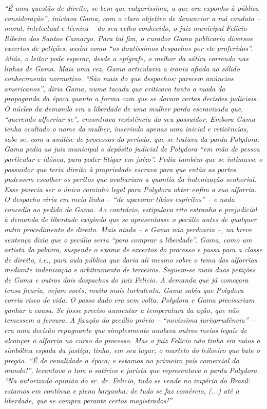 {\begin{didascalia}
\emph{``É uma questão de direito, se bem que vulgaríssima, a que ora
exponho à pública consideração'', iniciava Gama, com o claro objetivo de
denunciar a má conduta -- moral, intelectual e técnica -- do seu velho
conhecido, o juiz municipal Felicio Ribeiro dos Santos Camargo. Para tal
fim, o curador Gama publicaria diversos excertos de petições, assim como
``os doutíssimos despachos por ele proferidos''. Aliás, o leitor pode
esperar, desde a epígrafe, o melhor da sátira correndo nas linhas de
Gama. Mais uma vez, Gama articularia a ironia afiada ao sólido
conhecimento normativo. ``São mais do que despachos; parecem anúncios
americanos'', diria Gama, numa tacada que criticava tanto a moda da
propaganda da época quanto a forma com que se davam certas decisões
judiciais. O núcleo da demanda era a liberdade de uma mulher parda
escravizada que, ``querendo alforriar-se'', encontrava resistência do seu
possuidor. Embora Gama tenha ocultado o nome da mulher, inserindo apenas
uma inicial e reticências, sabe-se, com a análise de processos do
período, que se tratava da parda Polydora. Gama pedia ao juiz municipal
o depósito judicial de Polydora ``em mão de pessoa particular e idônea,
para poder litigar em juízo''. Pedia também que se intimasse o possuidor
que teria direito à propriedade escrava para que então as partes
pudessem escolher os peritos que avaliariam a quantia da indenização
senhorial. Esse parecia ser o único caminho legal para Polydora obter
enfim a sua alforria. O despacho viria em meia linha -- ``de apavorar
tíbios espíritos'' -- e nada concedia ao pedido de Gama. Ao contrário,
estipulava rito estranho e prejudicial à demanda de liberdade exigindo
que se apresentasse o pecúlio antes de qualquer outro procedimento de
direito. Mais ainda -- e Gama não perdoaria --, na breve sentença dizia
que o pecúlio seria ``para comprar a liberdade''. Gama, como um artista da
palavra, suspende o exame de excertos do processo e passa para a classe
de direito, i.e., para aula pública que daria ali mesmo sobre o tema das
alforrias mediante indenização e arbitramento de terceiros. Seguem-se
mais duas petições de Gama e outros dois despachos do juiz Felicio. A
demanda que já começara tensa ficaria, vejam vocês, muito mais
turbulenta. Gama sabia que Polydora corria risco de vida. O passo dado
era sem volta. Polydora e Gama precisariam ganhar a causa. Se fosse
preciso aumentar a temperatura da ação, que não temessem a fervura. A
fixação do pecúlio prévio -- ``novíssima jurisprudência'' -- era uma
decisão repugnante que simplesmente anulava outros meios legais de
alcançar a alforria no curso do processo. Mas o juiz Felicio não tinha
em mãos a simbólica espada da justiça; tinha, em seu lugar, o martelo do
leiloeiro que bate o pregão. ``É de venalidade a época; e estamos no
primeiro país comercial do mundo!'', levantava o tom o satírico e jurista
que representava a parda Polydora. ``Na autorizada opinião do sr. dr.
Felicio, tudo se vende no império do Brasil: estamos em contínua e plena
barganha: de tudo se faz comércio, (...) até a liberdade, que se compra
perante certos magistrados!''}
\end{didascalia}

}
